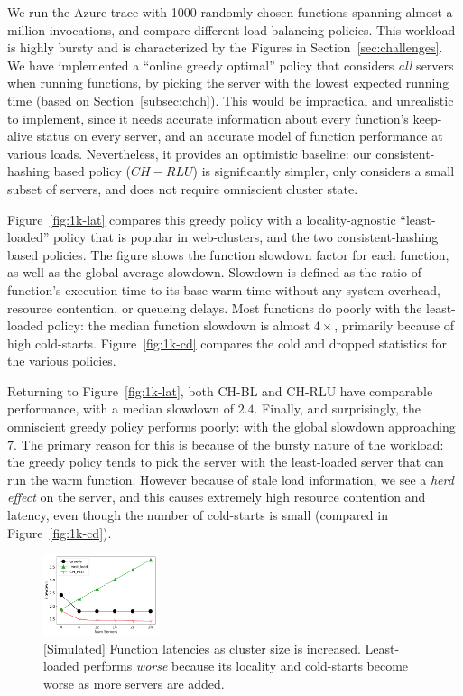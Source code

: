 We run the Azure trace with 1000 randomly chosen functions spanning almost a million invocations, and compare different load-balancing policies.
This workload is highly bursty and is characterized by the Figures in Section~\ref{sec:challenges}. 
We have implemented a ``online greedy optimal'' policy that considers \emph{all} servers when running functions, by picking the server with the lowest expected running time (based on Section~\ref{subsec:chch}).
This would be impractical and unrealistic to implement, since it needs accurate information about every function's keep-alive status on every server, and an accurate model of function performance at various loads.
Nevertheless, it provides an optimistic baseline: our consistent-hashing based policy ($CH-RLU$) is significantly simpler, only considers a small subset of servers, and does not require omniscient cluster state. 

Figure~\ref{fig:1k-lat} compares this greedy policy with a locality-agnostic ``least-loaded'' policy that is popular in web-clusters, and the two consistent-hashing based policies. 
The figure shows the function slowdown factor for each function, as well as the global average slowdown.
Slowdown is defined as the ratio of function's execution time to its base warm time without any system overhead, resource contention, or queueing delays.
Most functions do poorly with the least-loaded policy: the median function slowdown is almost $4\times$, primarily because of high cold-starts.
Figure~\ref{fig:1k-cd} compares the cold and dropped statistics for the various policies.

Returning to Figure~\ref{fig:1k-lat}, both CH-BL and CH-RLU have comparable performance, with a median slowdown of $2.4$. 
Finally, and surprisingly, the omniscient greedy policy performs poorly: with the global slowdown approaching $7$.
The primary reason for this is because of the bursty nature of the workload: the greedy policy tends to pick the server with the least-loaded server that can run the warm function.
However because of stale load information, we see a \emph{herd effect} on the server, and this causes extremely high resource contention and latency, even though the number of cold-starts is small (compared in Figure~\ref{fig:1k-cd}). 



\begin{figure}
  \centering
  \includegraphics[width=0.3\textwidth]{../figs/1k/latencies-250scaling.pdf}
  \caption{[Simulated] Function latencies as cluster size is increased. Least-loaded performs \emph{worse} because its locality and cold-starts become worse as more servers are added.}
  \label{fig:1k-scaling}
\end{figure}


